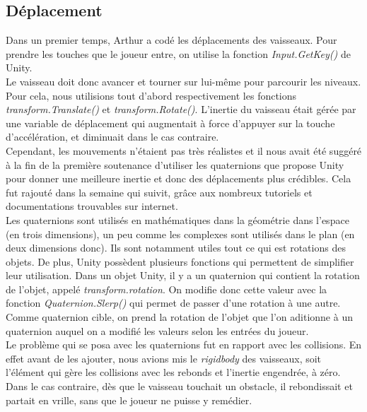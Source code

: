 \documentclass[12pt, titlepage]{article}
\begin{document}
\begin{spacing}{1.5}
\subsection{Déplacement}

Dans un premier temps, Arthur a codé les déplacements des vaisseaux. Pour prendre les touches que le joueur entre, on utilise la fonction \textit{Input.GetKey()} de Unity.\\

Le vaisseau doit donc avancer et tourner sur lui-même pour parcourir les niveaux. Pour cela, nous utilisions tout d'abord respectivement les fonctions \textit{transform.Translate()} et \textit{transform.Rotate()}. L'inertie du vaisseau était gérée par une variable de déplacement qui augmentait à force d'appuyer sur la touche d'accélération, et diminuait dans le cas contraire.\\

Cependant, les mouvements n'étaient pas très réalistes et il nous avait été suggéré à la fin de la première soutenance d'utiliser les quaternions que propose Unity pour donner une meilleure inertie et donc des déplacements plus crédibles. Cela fut rajouté dans la semaine qui suivit, grâce aux nombreux tutoriels et documentations trouvables sur internet.\\

Les quaternions sont utilisés en mathématiques dans la géométrie dans l'espace (en trois dimensions), un peu comme les complexes sont utilisés dans le plan (en deux dimensions donc). Ils sont notamment utiles tout ce qui est rotations des objets. De plus, Unity possèdent plusieurs fonctions qui permettent de simplifier leur utilisation. Dans un objet Unity, il y a un quaternion qui contient la rotation de l'objet, appelé \textit{transform.rotation}. On modifie donc cette valeur avec la fonction \textit{Quaternion.Slerp()} qui permet de passer d'une rotation à une autre. Comme quaternion cible, on prend la rotation de l'objet que l'on aditionne à un quaternion auquel on a modifié les valeurs selon les entrées du joueur.\\

Le problème qui se posa avec les quaternions fut en rapport avec les collisions. En effet avant de les ajouter, nous avions mis le \textit{rigidbody} des vaisseaux, soit l'élément qui gère les collisions avec les rebonds et l'inertie engendrée, à zéro. Dans le cas contraire, dès que le vaisseau touchait un obstacle, il rebondissait et partait en vrille, sans que le joueur ne puisse y remédier.\\


\end{spacing}
\end{document}
